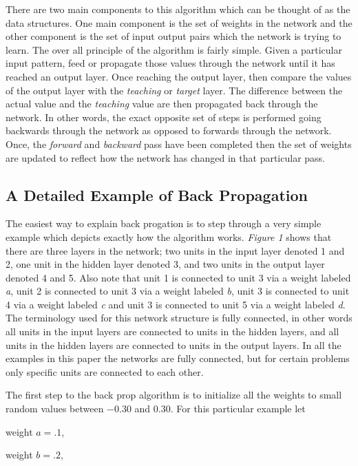 	There are two main components to this algorithm which can be
thought of as the data structures.  One main component is the set of
weights in the network and the other component is the set of input
output pairs which the network is trying to learn.  The over all
principle of the algorithm is fairly simple.  Given a particular input
pattern, feed or propagate those values through the network until it
has reached an output layer.  Once reaching the output layer, then
compare the values of the output layer with the {\it teaching} or {\it
target} layer.  The difference between the actual value and the {\it
teaching} value are then propagated back through the network.  In
other words, the exact opposite set of steps is performed going
backwards through the network as opposed to forwards through the
network.  Once, the {\it forward} and {\it backward} pass have been
completed then the set of weights are updated to reflect how the
network has changed in that particular pass.  

\subsection{A Detailed Example of Back Propagation}

	The easiest way to explain back progation is to step through a
very simple example which depicts exactly how the algorithm works.
{\it Figure 1} shows that there are three layers in the network; two
units in the input layer denoted 1 and 2, one unit in the hidden layer
denoted 3, and two units in the output layer denoted 4 and 5.  Also
note that unit 1 is connected to unit 3 via a weight labeled {\it a},
unit 2 is connected to unit 3 via a weight labeled {\it b}, unit 3 is
connected to unit 4 via a weight labeled {\it c} and unit 3 is
connected to unit 5 via a weight labeled {\it d}.  The terminology
used for this network structure is fully connected, in other words all
units in the input layers are connected to units in the hidden layers,
and all units in the hidden layers are connected to units in the
output layers.  In all the examples in this paper the networks are
fully connected, but for certain problems only specific units are
connected to each other.

	The first step to the back prop algorithm is to initialize all
the weights to small random values between $-0.30$ and $0.30$.  For
this particular example let 

	weight $a = .1$, 

	weight $b = .2$, 

